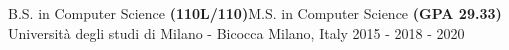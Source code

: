 

\begin{cventries}

  \cventry
    {B.S. in Computer Science \textbf{(110L/110)}\linebreak M.S. in Computer Science \textbf{(GPA 29.33)} } %
    {Università degli studi di Milano - Bicocca} %
    {Milano, Italy} %
    {2015 - 2018  - 2020} %
    {
    }
\vspace{-0.7cm}
\end{cventries}
